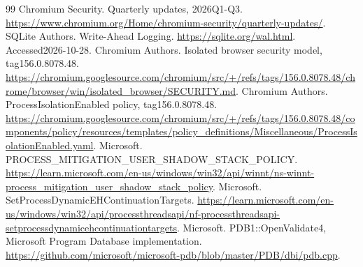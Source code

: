 \documentclass[UTF8,a4paper,zihao=5,fontset=windows]{ctexart}
\begin{document}
\begin{thebibliography}{99}
 Chromium Security. Quarterly updates, 2026Q1-Q3. \url{https://www.chromium.org/Home/chromium-security/quarterly-updates/}.
 SQLite Authors. Write-Ahead Logging. \url{https://sqlite.org/wal.html}. Accessed2026-10-28.
 Chromium Authors. Isolated browser security model, tag156.0.8078.48. \url{https://chromium.googlesource.com/chromium/src/+/refs/tags/156.0.8078.48/chrome/browser/win/isolated_browser/SECURITY.md}.
 Chromium Authors. ProcessIsolationEnabled policy, tag156.0.8078.48. \url{https://chromium.googlesource.com/chromium/src/+/refs/tags/156.0.8078.48/components/policy/resources/templates/policy_definitions/Miscellaneous/ProcessIsolationEnabled.yaml}.
 Microsoft. PROCESS\_MITIGATION\_USER\_SHADOW\_STACK\_POLICY. \url{https://learn.microsoft.com/en-us/windows/win32/api/winnt/ns-winnt-process_mitigation_user_shadow_stack_policy}.
 Microsoft. SetProcessDynamicEHContinuationTargets. \url{https://learn.microsoft.com/en-us/windows/win32/api/processthreadsapi/nf-processthreadsapi-setprocessdynamicehcontinuationtargets}.
 Microsoft. PDB1::OpenValidate4, Microsoft Program Database implementation. \url{https://github.com/microsoft/microsoft-pdb/blob/master/PDB/dbi/pdb.cpp}.
\end{thebibliography}
\end{document}

